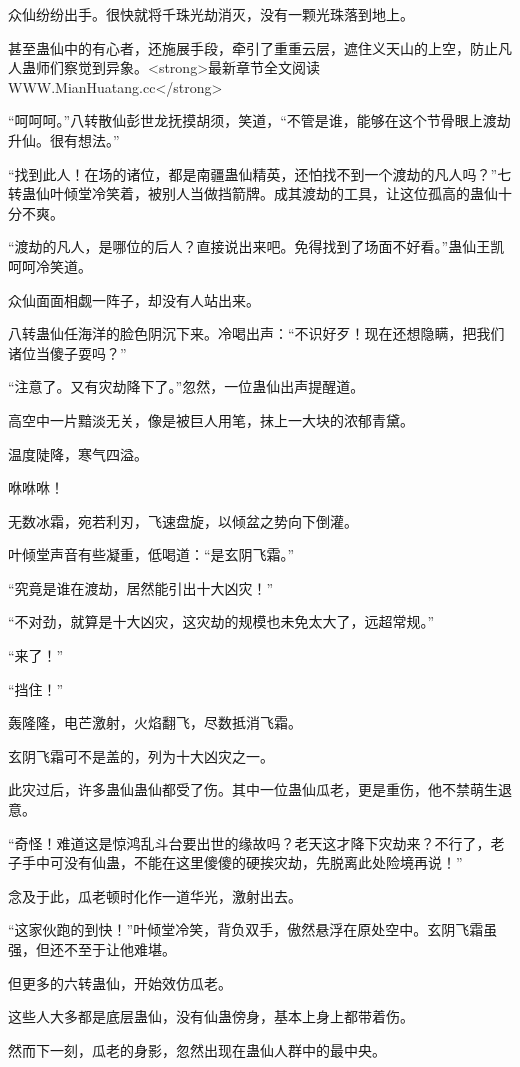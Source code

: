 \begin{this_body}
众仙纷纷出手。很快就将千珠光劫消灭，没有一颗光珠落到地上。

甚至蛊仙中的有心者，还施展手段，牵引了重重云层，遮住义天山的上空，防止凡人蛊师们察觉到异象。<strong>最新章节全文阅读WWW.MianHuatang.cc</strong>

“呵呵呵。”八转散仙彭世龙抚摸胡须，笑道，“不管是谁，能够在这个节骨眼上渡劫升仙。很有想法。”

“找到此人！在场的诸位，都是南疆蛊仙精英，还怕找不到一个渡劫的凡人吗？”七转蛊仙叶倾堂冷笑着，被别人当做挡箭牌。成其渡劫的工具，让这位孤高的蛊仙十分不爽。

“渡劫的凡人，是哪位的后人？直接说出来吧。免得找到了场面不好看。”蛊仙王凯呵呵冷笑道。

众仙面面相觑一阵子，却没有人站出来。

八转蛊仙任海洋的脸色阴沉下来。冷喝出声：“不识好歹！现在还想隐瞒，把我们诸位当傻子耍吗？”

“注意了。又有灾劫降下了。”忽然，一位蛊仙出声提醒道。

高空中一片黯淡无关，像是被巨人用笔，抹上一大块的浓郁青黛。

温度陡降，寒气四溢。

咻咻咻！

无数冰霜，宛若利刃，飞速盘旋，以倾盆之势向下倒灌。

叶倾堂声音有些凝重，低喝道：“是玄阴飞霜。”

“究竟是谁在渡劫，居然能引出十大凶灾！”

“不对劲，就算是十大凶灾，这灾劫的规模也未免太大了，远超常规。”

“来了！”

“挡住！”

轰隆隆，电芒激射，火焰翻飞，尽数抵消飞霜。

玄阴飞霜可不是盖的，列为十大凶灾之一。

此灾过后，许多蛊仙蛊仙都受了伤。其中一位蛊仙瓜老，更是重伤，他不禁萌生退意。

“奇怪！难道这是惊鸿乱斗台要出世的缘故吗？老天这才降下灾劫来？不行了，老子手中可没有仙蛊，不能在这里傻傻的硬挨灾劫，先脱离此处险境再说！”

念及于此，瓜老顿时化作一道华光，激射出去。

“这家伙跑的到快！”叶倾堂冷笑，背负双手，傲然悬浮在原处空中。玄阴飞霜虽强，但还不至于让他难堪。

但更多的六转蛊仙，开始效仿瓜老。

这些人大多都是底层蛊仙，没有仙蛊傍身，基本上身上都带着伤。

然而下一刻，瓜老的身影，忽然出现在蛊仙人群中的最中央。


\end{this_body}

